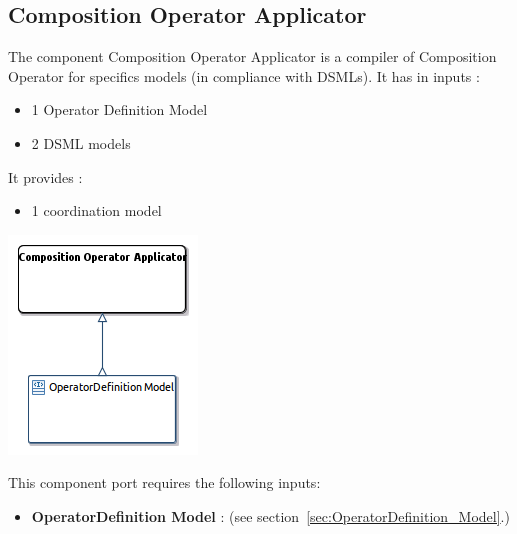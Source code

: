 \documentclass{gemoc} %
\begin{document}
\subsection{Composition Operator Applicator}
\label{sec:Composition_Operator_Applicator}
The component Composition Operator Applicator is a compiler of Composition Operator for specifics models (in compliance with DSMLs).
\newline It has in inputs :
\begin{itemize}
\item 1 Operator Definition Model
\item 2 DSML models
\end{itemize}
It provides :
\begin{itemize}
\item 1 coordination model
\end{itemize}
\begin{center}
\includegraphics*[trim=0.0cm 0.0cm 0cm 0.0cm, clip=true]{../images/generated/Generated_Composition_Operator_Applicator.png}
\end{center}

This component port requires the following inputs:
\begin{itemize}
  \item \textbf{OperatorDefinition Model} :
(see section~\ref{sec:OperatorDefinition_Model}.)
\end{itemize}
\end{document}
